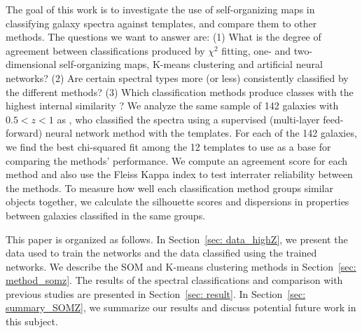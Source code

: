 The goal of this work is to investigate the use of self-organizing maps in classifying galaxy spectra against templates, and compare them to other methods. 
The questions we want to answer are: 
(1) What is the degree of agreement between classifications produced by $\chi^2$ fitting, one- and two-dimensional self-organizing maps, K-means clustering and artificial neural networks? 
(2) Are certain spectral types more (or less) consistently classified by the different methods? 
(3) Which classification methods produce classes with the highest internal similarity ?
We analyze the same sample of 142 galaxies with $0.5 < z < 1$ as 
\citet[][hereafter ]{Hossein12}, who classified the spectra using a supervised (multi-layer feed-forward) neural network method with the  templates.
For each of the 142 galaxies, we find the best chi-squared fit among the 12 templates to use as a base for comparing the methods' performance.
We compute an agreement score for each method and also use the Fleiss Kappa index \citep{Fleiss71} to test interrater reliability 
between the methods.
To measure how well each classification method groups similar objects together, we
calculate the silhouette scores and dispersions in properties between galaxies classified in the same groups.


This paper is organized as follows.
In Section~\ref{sec: data_highZ}, we present the data used to train the networks and the data classified using the trained networks. 
We describe the SOM and K-means clustering methods in Section~\ref{sec: method_somz}. 
The results of the spectral classifications and comparison with previous studies are presented in Section~\ref{sec: result}. 
In Section~\ref{sec: summary_SOMZ}, we summarize our results and discuss potential future work in this subject.